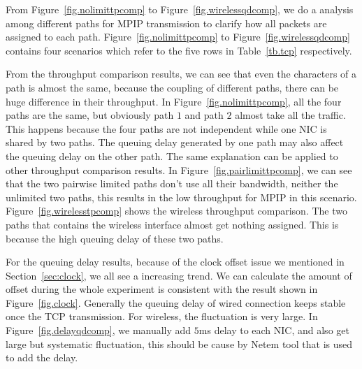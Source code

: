 From Figure~\ref{fig.nolimittpcomp} to Figure~\ref{fig.wirelessqdcomp}, we do a analysis among different paths for MPIP transmission to clarify how all packets are assigned to each path. Figure~\ref{fig.nolimittpcomp} to Figure~\ref{fig.wirelessqdcomp} contains four scenarios which refer to the five rows in Table~\ref{tb.tcp} respectively. 

From the throughput comparison results, we can see that even the characters of a path is almost the same, because the coupling of different paths, there can be huge difference in their throughput. In Figure~\ref{fig.nolimittpcomp}, all the four paths are the same, but obviously path $1$ and path $2$ almost take all the traffic. This happens because the four paths are not independent while one NIC is shared by two paths. The queuing delay generated by one path may also affect the queuing delay on the other path. The same explanation can be applied to other throughput comparison results. In Figure~\ref{fig.pairlimittpcomp}, we can see that the two pairwise limited paths don't use all their bandwidth, neither the unlimited two paths, this results in the low throughput for MPIP in this scenario. Figure~\ref{fig.wirelesstpcomp} shows the wireless throughput comparison. The two paths that contains the wireless interface almost get nothing assigned. This is because the high queuing delay of these two paths.

For the queuing delay results, because of the clock offset issue we mentioned in Section~\ref{sec:clock}, we all see a increasing trend. We can calculate the amount of offset during the whole experiment is consistent with the result shown in Figure~\ref{fig.clock}. Generally the queuing delay of wired connection keeps stable once the TCP transmission. For wireless, the fluctuation is very large. In Figure~\ref{fig.delayqdcomp}, we manually add $5$ms delay to each NIC, and also get large but systematic fluctuation, this should be cause by Netem tool that is used to add the delay.


